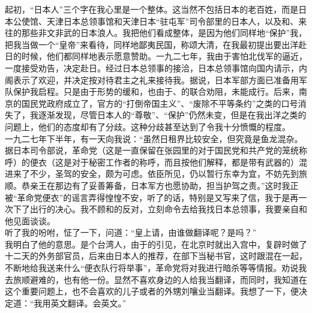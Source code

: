 起初，“日本人”三个字在我心里是一个整体。这当然不包括日本的老百姓，而是日本公使馆、天津日本总领事馆和天津日本“驻屯军”司令部里的日本人，以及和、来往的那些非文非武的日本浪人。我把他们看成整体，是因为他们同样地“保护”我，把我当做一个“皇帝”来看待，同样地鄙夷民国，称颂大清，在我最初提出要出洋赴日的时候，他们都同样地表示愿意赞助。一九二七年，我由于害怕北伐军的逼近，一度接受劝告，决定赴日。经过日本总领事的接洽，日本总领事馆向国内请示，内阁表示了欢迎，并决定按对待君主之礼来接待我。据说，日本军部方面已准备用军队保护我启程。只是由于形势的缓和，也由于、的联合劝阻，未能成行。后来，南京的国民党政府成立了，官方的“打倒帝国主义”、“废除不平等条约”之类的口号消失了，我逐渐发现，尽管日本人的“尊敬”、“保护”仍然未变，但是在我出洋之类的问题上，他们的态度却有了分歧。这种分歧甚至达到了令我十分愤慨的程度。\\

一九二七年下半年，有一天向我说：“虽然日租界比较安全，但究竟是鱼龙混杂。据日本司令部说，革命党（这是一直保留在张园里的对于国民党和共产党的笼统称呼）的便衣（这是对于秘密工作者的称呼，而且按他们解释，都是带有武器的）混进来了不少，圣驾的安全，颇为可虑。依臣所见，仍以暂行东幸为宜，不妨先到旅顺。恭亲王在那边有了妥善筹备，日本军方也愿协助，担当护驾之责。”这时我正被“革命党便衣”的谣言弄得惶惶不安，听了的话，特别是又写来了信，我于是再一次下了出行的决心。我不顾和的反对，立刻命令去给我找日本总领事，我要亲自和他见面谈谈。\\

听了我的吩咐，怔了一下，问道：“皇上请，由谁做翻译呢？是吗？”\\

我明白了他的意思。是个台湾人，由于的引见，在北京时就出入宫中，复辟时做了十二天的外务部官员，后来由日本人的推荐，在部下当秘书官，这时跟混在一起，不断地给我送来什么“便衣队行将举事”，革命党将对我进行暗杀等等情报。劝说我去旅顺避难的，也有他一份。显然不喜欢身边的人给我当翻译，而同时，我知道在这个重要问题上，也不会喜欢的儿子或者的外甥刘嚷业当翻译。我想了一下，便决定道：“我用英文翻译。会英文。”\\

